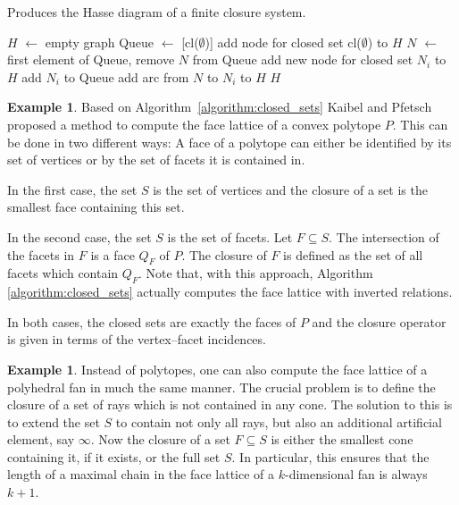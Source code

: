 \documentclass[11pt,a4paper]{amsart}
\theoremstyle{definition}
\newtheorem{example}[definition]{Example}
\theoremstyle{plain}
\begin{document}
\begin{algorithm}
 \caption{Produces the Hasse diagram of a finite closure system.}\label{algorithm:closed_sets}
\begin{algorithmic}
  \State $H$ $\leftarrow$ empty graph
  \State Queue $\leftarrow$ [cl($\emptyset$)]
  \State add node for closed set cl($\emptyset$) to $H$
      \State $N$ $\leftarrow$ first element of Queue, remove $N$ from Queue
	     \State add new node for closed set $N_i$ to $H$
             \State add $N_i$ to Queue
	  \EndIf
	  \State add arc from $N$ to $N_i$ to $H$
      \EndFor
  \EndWhile 
  \State \Return $H$
 \EndProcedure
\end{algorithmic}
\end{algorithm}

\begin{example}\label{exmp:polytope}
  Based on Algorithm~\ref{algorithm:closed_sets} Kaibel and Pfetsch \cite{KaibelPfetsch:2002} proposed a method to compute the face lattice of a convex polytope $P$. This can be done in two different ways:
  A face of a polytope can either be identified by its set of vertices or by the set of facets it is contained in.
  
  In the first case, the set $S$ is the set of vertices and the closure of a set is the smallest face containing this set.
  
  In the second case, the set $S$ is the set of facets. Let $F \subseteq S$. The intersection of the facets in $F$ is a face $Q_F$ of $P$. The closure of $F$ is defined as the set of all facets which contain $Q_F$. Note that, with this approach, Algorithm \ref{algorithm:closed_sets} actually computes the face lattice with inverted relations.
  
  In both cases, the closed sets are exactly the faces of $P$ and the closure operator is given in terms of the vertex--facet incidences.
\end{example}

\begin{example}\label{example:fan}
 Instead of polytopes, one can also compute the face lattice of a polyhedral fan in much the same manner. The crucial problem is to define the closure of a set of rays which is not contained in any cone. The solution to this is to extend the set $S$ to contain not only all rays, but also an additional artificial element, say $\infty$. Now the closure of a set $F \subseteq S$ is either the smallest cone containing it, if it exists, or the full set $S$. In particular, this ensures that the length of a maximal chain in the face lattice of a $k$-dimensional fan is always $k+1$.
\end{example}
\end{document}
